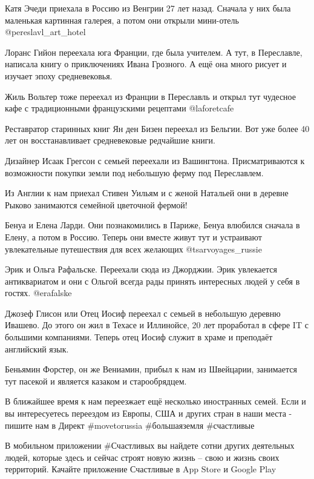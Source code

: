 Катя Эчеди приехала в Россию из Венгрии 27 лет назад. Сначала у них была
маленькая картинная галерея, а потом они открыли мини-отель
@pereslavl\_art\_hotel

Лоранс Гийон переехала юга Франции, где была учителем. А тут, в Переславле,
написала книгу о приключениях Ивана Грозного. А ещё она много рисует и изучает
эпоху средневековья. 

Жиль Вольтер тоже переехал из Франции в Переславль и открыл тут чудесное кафе с
традиционными французскими рецептами @laforetcafe

Реставратор старинных книг Ян ден Бизен переехал из Бельгии. Вот уже более 40
лет он восстанавливает средневековые редчайшие книги. 

Дизайнер Исаак Грегсон с семьей переехали из Вашингтона. Присматриваются к
возможности покупки земли под небольшую ферму под Переславлем.

Из Англии к нам приехал Стивен Уильям и с женой Натальей они в деревне Рыково
занимаются семейной цветочной фермой! 

Бенуа и Елена Ларди. Они познакомились в Париже, Бенуа влюбился сначала в
Елену, а потом в Россию. Теперь они вместе живут тут и устраивают увлекательные
путешествия для всех желающих @tsarvoyages\_russie

Эрик и Ольга Рафальске. Переехали сюда из Джорджии. Эрик увлекается
антиквариатом и они с Ольгой всегда рады принять интересных людей у себя в
гостях. @erafalske

Джозеф Глисон или Отец Иосиф переехал с семьей в небольшую деревню Ивашево. До
этого он жил в Техасе и Иллинойсе, 20 лет проработал в сфере IT с большими
компаниями. Теперь отец Иосиф служит в храме и преподаёт английский язык.

Беньямин Форстер, он же Вениамин, прибыл к нам из Швейцарии, занимается тут
пасекой и является казаком и старообрядцем.

В ближайшее время к нам переезжает ещё несколько иностранных семей. Если и вы
интересуетесь переездом из Европы, США  и других стран в наши места - пишите
нам в Директ \#movetorussia  \#большаяземля \#счастливые

В мобильном приложении #Счастливых вы найдете сотни других деятельных людей,
которые здесь и сейчас строят новую жизнь – свою и  жизнь своих территорий.
Качайте приложение Счастливые в App Store и Google Play
